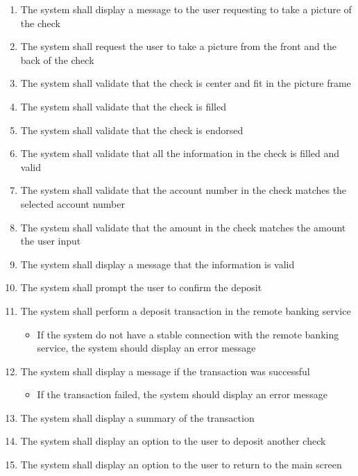 \begin{enumerate}
    \item  The system shall display a message to the user requesting to take a 
    picture of the check
    \item The system shall request the user to take a picture from the front  
    and the back of the check
    \item The system shall validate that the check is center and fit in the 
    picture frame
    \item The system shall validate that the check is filled
    \item The system shall validate that the check is endorsed
    \item The system shall validate that all the information in the check is 
    filled and valid
    \pagebreak
    \item The system shall validate that the account number in the check 
    matches the selected account number
    \item The system shall validate that the amount in the check matches the 
    amount the user input
    \item The system shall display a message that the information is valid
    \item The system shall prompt the user to confirm the deposit
    \item The system shall perform a deposit transaction in the remote banking 
    service
    \begin{itemize}
        \item If the system do not have a stable connection with the remote 
        banking service, the system should display an error message
    \end{itemize}
    \item The system shall display a message if the transaction was successful
    \begin{itemize}
        \item If the transaction failed, the system should display an error 
        message
    \end{itemize}	
    \item The system shall display a summary of the transaction
    \item The system shall display an option to the user to deposit another 
    check
    \item The system shall display an option to the user to return to the main 
    screen
\end{enumerate}